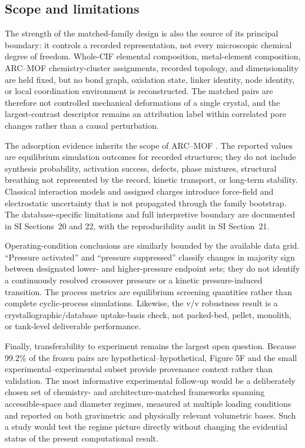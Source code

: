 \documentclass[11pt,a4paper]{article}
\newcommand{\SIsec}[1]{SI Section~#1}
\newcommand{\SIsecs}[1]{SI Sections~#1}
\begin{document}
\subsection{Scope and limitations}

The strength of the matched-family design is also the source of its principal
boundary: it controls a recorded representation, not every microscopic chemical
degree of freedom. Whole-CIF elemental composition, metal-element composition,
ARC--MOF chemistry-cluster assignments, recorded topology, and dimensionality are
held fixed, but no bond graph, oxidation state, linker identity, node identity, or
local coordination environment is reconstructed. The matched pairs are therefore
not controlled mechanical deformations of a single crystal, and the
largest-contrast descriptor remains an attribution label within correlated pore
changes rather than a causal perturbation.

The adsorption evidence inherits the scope of ARC--MOF
\cite{burner2023arcmof}. The reported values are equilibrium simulation outcomes
for recorded structures; they do not include synthesis probability, activation
success, defects, phase mixtures, structural breathing not represented by the
record, kinetic transport, or long-term stability. Classical interaction models and
assigned charges introduce force-field and electrostatic uncertainty that is not
propagated through the family bootstrap. The database-specific limitations and full
interpretive boundary are documented in \SIsecs{20 and 22}, with the reproducibility
audit in \SIsec{21}.

Operating-condition conclusions are similarly bounded by the available data grid.
``Pressure activated'' and ``pressure suppressed'' classify changes in majority
sign between designated lower- and higher-pressure endpoint sets; they do not
identify a continuously resolved crossover pressure or a kinetic pressure-induced
transition. The process metrics are equilibrium screening quantities rather than
complete cyclic-process simulations. Likewise, the v/v robustness result is a
crystallographic/database uptake-basis check, not packed-bed, pellet, monolith, or
tank-level deliverable performance.

Finally, transferability to experiment remains the largest open question. Because
99.2\% of the frozen pairs are hypothetical--hypothetical, Figure 5F and the small
experimental--experimental subset provide provenance context rather than validation.
The most informative experimental follow-up would be a deliberately chosen set of
chemistry- and architecture-matched frameworks spanning accessible-space and
diameter regimes, measured at multiple loading conditions and reported on both
gravimetric and physically relevant volumetric bases. Such a study would test the
regime picture directly without changing the evidential status of the present
computational result.
\end{document}
